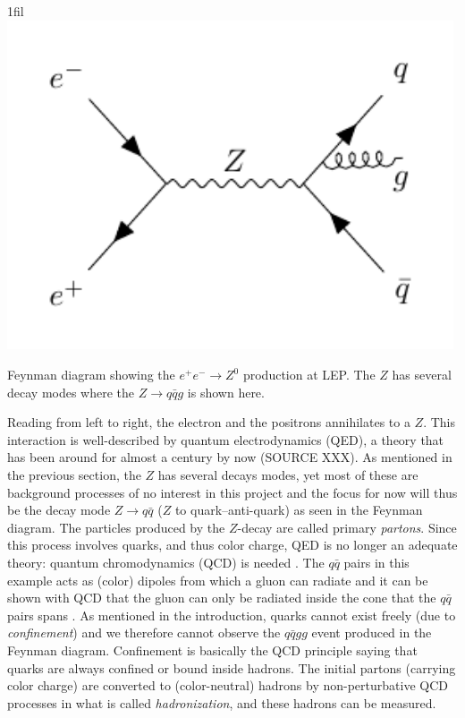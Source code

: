 \documentclass[a4paper, twoside, nobib]{tufte-book}
\makeatletter
\newcommand*{\centerfloat}{%
  \parindent \z@
  \leftskip \z@ \@plus 1fil \@minus \textwidth
  \rightskip\leftskip
  \parfillskip \z@skip}
\newcommand{\autocite}[1]{\citep{#1}}
\makeatother
\begin{document}
\begin{marginfigure}
  \centerfloat
  \includegraphics[width=0.99\textwidth]{figures/feynman_diagrams/eeZqqg.pdf}
  \caption[Feynman diagram for the jet production at LEP]{Feynman diagram showing the $e^+ e^- \rightarrow Z^0$ production at LEP. The $Z$ has several decay modes where the $Z \rightarrow q\bar{q}g$ is shown here.}
  \label{fig:hep:feynman_3j_qqg}
\end{marginfigure}

Reading from left to right, the electron and the positrons annihilates to a $Z$. This interaction is well-described by quantum electrodynamics (QED), a theory that has been around for almost a century by now (SOURCE XXX). As mentioned in the previous section, the $Z$ has several decays modes, yet most of these are background processes of no interest in this project and the focus for now will thus be the decay mode $Z \rightarrow q\bar{q}$ ($Z$ to quark--anti-quark) as seen in the Feynman diagram. The particles produced by the $Z$-decay are called primary \emph{partons}. Since this process involves quarks, and thus color charge, QED is no longer an adequate theory: quantum chromodynamics (QCD) is needed \autocite{Armstrong1998hy}. The $q\bar{q}$ pairs in this example acts as (color) dipoles from which a gluon can radiate and it can be shown with QCD that the gluon can only be radiated inside the cone that the $q\bar{q}$ pairs spans \autocite{bierlichRopeHadronizationGeometry2016}. As mentioned in the introduction, quarks cannot exist freely (due to \emph{confinement}) and we therefore cannot observe the $q\bar{q}gg$ event produced in the Feynman diagram. Confinement is basically the QCD principle saying that quarks are always confined or bound inside hadrons. The initial partons (carrying color charge) are converted to (color-neutral) hadrons by non-perturbative QCD processes in what is called \emph{hadronization}, and these hadrons can be measured. 
\end{document}
